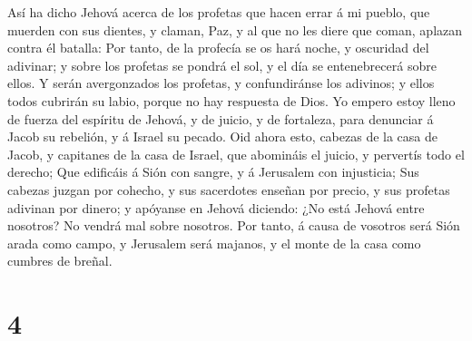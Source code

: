 Así ha dicho Jehová acerca de los profetas que hacen errar
á mi pueblo, que muerden con sus dientes, y claman, Paz, y al que no les
diere que coman, aplazan contra él batalla:  Por tanto, de
la profecía se os hará noche, y oscuridad del adivinar; y sobre los
profetas se pondrá el sol, y el día se entenebrecerá sobre ellos.
 Y serán avergonzados los profetas, y confundiránse los
adivinos; y ellos todos cubrirán su labio, porque no hay respuesta de
Dios.  Yo empero estoy lleno de fuerza del espíritu de
Jehová, y de juicio, y de fortaleza, para denunciar á Jacob su rebelión,
y á Israel su pecado.  Oid ahora esto, cabezas de la casa de
Jacob, y capitanes de la casa de Israel, que abomináis el juicio, y
pervertís todo el derecho;  Que edificáis á Sión con
sangre, y á Jerusalem con injusticia;  Sus cabezas juzgan
por cohecho, y sus sacerdotes enseñan por precio, y sus profetas
adivinan por dinero; y apóyanse en Jehová diciendo: ¿No está Jehová
entre nosotros? No vendrá mal sobre nosotros.  Por tanto, á
causa de vosotros será Sión arada como campo, y Jerusalem será majanos,
y el monte de la casa como cumbres de breñal.

\hypertarget{section-3}{%
\section{4}\label{section-3}}

